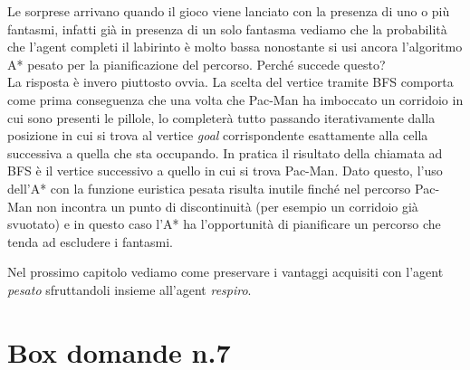 \documentclass[8pt]{book}
\begin{document}
Le sorprese arrivano quando il gioco viene lanciato con la presenza di uno o più fantasmi, infatti già in presenza di un solo fantasma vediamo che la probabilità che l'agent completi il labirinto è molto bassa nonostante si usi ancora l'algoritmo A* pesato per la pianificazione del percorso. Perché succede questo?\\
La risposta è invero piuttosto ovvia. La scelta del vertice tramite BFS comporta come prima conseguenza che una volta che Pac-Man ha imboccato un corridoio in cui sono presenti le pillole, lo completerà tutto passando iterativamente dalla posizione in cui si trova al vertice \emph{goal} corrispondente esattamente alla cella successiva a quella che sta occupando. In pratica il risultato della chiamata ad BFS è il vertice successivo a quello in cui si trova Pac-Man. Dato questo, l'uso dell'A* con la funzione euristica pesata risulta inutile finché nel percorso Pac-Man non incontra un punto di discontinuità (per esempio un corridoio già svuotato) e in questo caso l'A* ha l'opportunità di pianificare un percorso che tenda ad escludere i fantasmi.

Nel prossimo capitolo vediamo come preservare i vantaggi acquisiti con l'agent \emph{pesato} sfruttandoli insieme all'agent \emph{respiro}.

\newpage
\section*{Box domande n.7}
\end{document}
